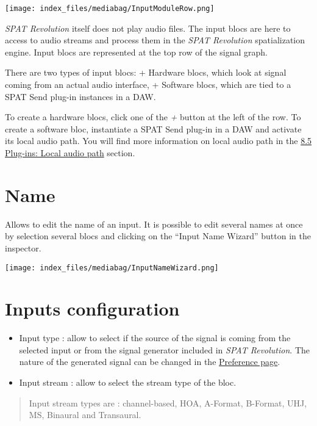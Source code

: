 \documentclass[
  letterpaper,
  DIV=11,
  numbers=noendperiod]{scrreport}
\providecommand{\tightlist}{%
  \setlength{\itemsep}{0pt}\setlength{\parskip}{0pt}}\usepackage{longtable,booktabs,array}
\begin{document}
\texttt{[image: index\_files/mediabag/InputModuleRow.png]}

\emph{SPAT Revolution} itself does not play audio files. The input blocs
are here to access to audio streams and process them in the \emph{SPAT
Revolution} spatialization engine. Input blocs are represented at the
top row of the signal graph.

There are two types of input blocs: + Hardware blocs, which look at
signal coming from an actual audio interface, + Software blocs, which
are tied to a SPAT Send plug-in instances in a DAW.

To create a hardware blocs, click one of the \emph{+} button at the left
of the row. To create a software bloc, instantiate a SPAT Send plug-in
in a DAW and activate its local audio path. You will find more
information on local audio path in the
\href{Ecosystem_\&_integration_DAW_Automation_Local_Audio_Path.md}{8.5
Plug-ins: Local audio path} section.

\hypertarget{name}{%
\section{Name}\label{name}}

Allows to edit the name of an input. It is possible to edit several
names at once by selection several blocs and clicking on the ``Input
Name Wizard'' button in the inspector.

\texttt{[image: index\_files/mediabag/InputNameWizard.png]}

\hypertarget{inputs-configuration}{%
\section{Inputs configuration}\label{inputs-configuration}}

\begin{itemize}
\tightlist
\item
  Input type : allow to select if the source of the signal is coming
  from the selected input or from the signal generator included in
  \emph{SPAT Revolution}. The nature of the generated signal can be
  changed in the \href{Application_Preferences.md}{Preference page}.
\item
  Input stream : allow to select the stream type of the bloc.
\end{itemize}

\begin{quote}
Input stream types are : channel-based, HOA, A-Format, B-Format, UHJ,
MS, Binaural and Transaural.
\end{quote}
\end{document}
